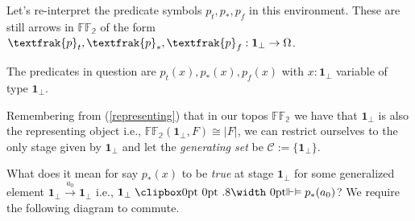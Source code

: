 Let's re-interpret the predicate symbols $p_t, p_*, p_f$ in this environment.
\newline
These are still arrows in $\mathbb{FF_2}$ of the form $\textfrak{p}_t, \textfrak{p}_*,\textfrak{p}_f  :\textbf{1}_\bot \rightarrow \Omega$.
\begin{remark}
	The predicates in question are $p_t(x), p_*(x), p_f(x)$ with $x : \textbf{1}_\bot$ variable of type $\textbf{1}_\bot$.
\end{remark}
Remembering from (\ref{representing}) that in our topos $\mathbb{FF_2}$ we have that $\textbf{1}_\bot$ is also the representing object i.e., $\mathbb{FF_2}(\textbf{1}_\bot, F) \cong |F|$, we can restrict ourselves to the only stage given by $\textbf{1}_\bot$ and let the \emph{generating set} be $\mathcal{C}:=\{\textbf{1}_\bot\}$.
\begin{ex}
What does it mean for say $p_*(x)$ to be \emph{true} at stage $\textbf{1}_\bot$ for some generalized element $\textbf{1}_\bot \xrightarrow{a_0} \textbf{1}_\bot$ i.e., $\textbf{1}_\bot \VDashA p_*(a_0)$? We require the following diagram to commute.

%



\end{ex}
